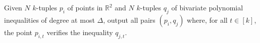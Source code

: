 \begin{problem}[%
	name={Offline Polynomial Dominance Reporting (offline PDR)}%
]
Given $N$ $k$-tuples $p_i$ of points in $\mathbb{R}^2$ and $N$ $k$-tuples $q_j$
of bivariate polynomial inequalities of degree at most $\Delta$,
output all pairs $(p_i,q_j)$ where, for all $t \in [k]$,
the point $p_{i,t}$ verifies the inequality $q_{j,t}$.
\end{problem}

